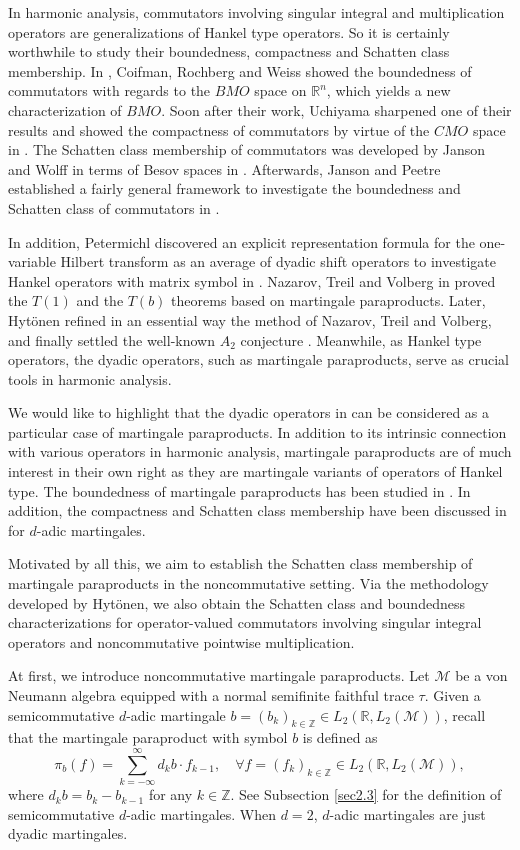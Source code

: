 \documentclass[oneside,english,a4wide]{amsart}
\numberwithin{equation}{section}
\numberwithin{figure}{section}
\theoremstyle{plain}
\theoremstyle{plain}
\theoremstyle{definition}
\theoremstyle{plain}
\theoremstyle{remark}
\theoremstyle{definition}
\theoremstyle{remark}
\theoremstyle{definition}
\newcommand{\M}{{\mathcal M}}
\newcommand{\8}{\infty}
\begin{document}
In harmonic analysis, commutators involving singular integral and multiplication operators are generalizations of Hankel type operators. So it is certainly worthwhile to study their boundedness, compactness and Schatten class membership. In \cite{CRW}, Coifman, Rochberg and Weiss showed the boundedness of commutators with regards to the $BMO$ space on $\mathbb{R}^n$, which yields a new characterization of $BMO$. Soon after their work, Uchiyama sharpened one of their results and showed the compactness of commutators by virtue of the $CMO$ space in \cite{Uchi}. The Schatten class membership of commutators was developed by Janson and Wolff in terms of Besov spaces in \cite{JW}. Afterwards, Janson and Peetre established a fairly general framework to investigate the boundedness and Schatten class of commutators in \cite{JPe}. 

In addition, Petermichl discovered an explicit representation formula for the one-variable Hilbert transform as an average of dyadic shift operators to investigate Hankel operators with matrix symbol in \cite{SPe}. Nazarov, Treil and Volberg in  \cite{NTV} proved the $T(1)$ and the $T(b)$ theorems based on martingale paraproducts. Later, Hyt\"{o}nen refined in an essential way the method of Nazarov, Treil and Volberg, and finally settled the well-known $A_2$ conjecture \cite{TH1}. Meanwhile, as Hankel type operators, the dyadic operators, such as martingale paraproducts, serve as crucial tools in harmonic analysis.

We would like to highlight that the dyadic operators in \cite{TH1} can be considered as a particular case of martingale paraproducts. In addition to its intrinsic connection with various operators in harmonic analysis, martingale paraproducts are of much interest in their own right as they are martingale variants of operators of Hankel type. The boundedness of martingale paraproducts has been studied in \cite{CL1}. In addition, the compactness and Schatten class membership have been discussed in \cite{CP} for $d$-adic martingales.

Motivated by all this, we aim to establish the Schatten class membership of martingale paraproducts in the noncommutative setting. Via the methodology developed by Hyt\"{o}nen, we also obtain the Schatten class and boundedness characterizations for operator-valued commutators involving singular integral operators and noncommutative pointwise multiplication.


	
	
At first, we introduce noncommutative martingale paraproducts. Let $\mathcal{M}$ be a von Neumann algebra equipped with a normal semifinite faithful trace $\tau$. Given a semicommutative $d$-adic martingale $b=(b_k)_{k\in\mathbb{Z}}\in L_2(\mathbb{R}, L_2(\M))$, recall that the martingale paraproduct with symbol $b$ is defined as
\begin{equation*}
	\pi_b(f)=\sum_{k=-\infty}^{\infty}d_kb \cdot f_{k-1}, \quad \forall f=(f_k)_{k\in\mathbb{Z}}\in L_2(\mathbb{R},L_2(\mathcal{M})),
\end{equation*}
where $d_kb=b_k-b_{k-1}$ for any $k\in\mathbb{Z}$. See Subsection \ref{sec2.3} for the definition of semicommutative $d$-adic martingales. When $d=2$, $d$-adic martingales are just dyadic martingales.
 
\end{document}
